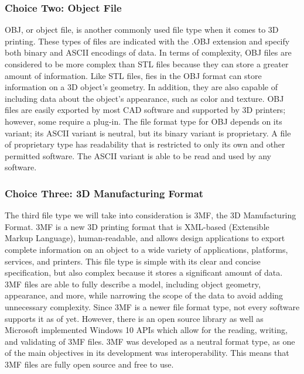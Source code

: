 \documentclass[letterpaper, onecolumn, draftclsnofoot,10pt, compsoc]{IEEEtran}
\begin{document}
\begin{singlespace}
\subsubsection{Choice Two: Object File}
OBJ, or object file, is another commonly used file type when it comes to 3D printing. 
These types of files are indicated with the .OBJ extension and specify both binary and ASCII encodings of data.
In terms of complexity, OBJ files are considered to be more complex than STL files because they can store a greater amount of information.
Like STL files, fies in the OBJ format can store information on a 3D object's geometry. 
In addition, they are also capable of including data about the object's appearance, such as color and texture. 
OBJ files are easily exported by most CAD software and supported by 3D printers; however, some require a plug-in. \cite{3dbeginweb}
The file format type for OBJ depends on its variant; its ASCII variant is neutral, but its binary variant is proprietary. 
A file of proprietary type has readability that is restricted to only its own and other permitted software. 
The ASCII variant is able to be read and used by any software.
\cite{all3dpweb}

\subsubsection{Choice Three: 3D Manufacturing Format}
The third file type we will take into consideration is 3MF, the 3D Manufacturing Format.
3MF is a new 3D printing format that is XML-based (Extensible Markup Language), human-readable, and allows design applications to export complete information on an object to a wide variety of applications, platforms, services, and printers. \cite{3mfweb}
This file type is simple with its clear and concise specification, but also complex because it stores a significant amount of data.
3MF files are able to fully describe a model, including object geometry, appearance, and more, while narrowing the scope of the data to avoid adding unnecessary complexity. 
Since 3MF is a newer file format type, not every software supports it as of yet.
However, there is an open source library as well as Microsoft implemented Windows 10 APIs which allow for the reading, writing, and validating of 3MF files. 
3MF was developed as a neutral format type, as one of the main objectives in its development was interoperability.
This means that 3MF files are fully open source and free to use. \cite{3mfweb}

\end{singlespace}
\end{document}
